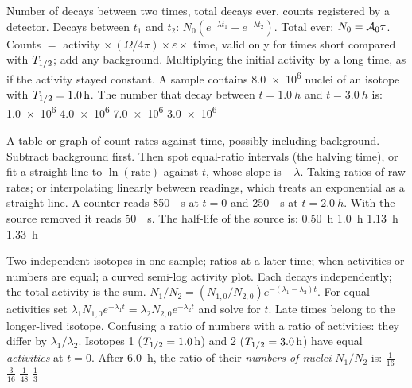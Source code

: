 {Number of decays between two times, total decays ever, counts registered by a detector.}
{Decays between $t_1$ and $t_2$: $N_0(e^{-\lambda t_1}-e^{-\lambda t_2})$. Total ever: $N_0=\mathcal{A}_0\tau$.
Counts $=$ activity $\times\,(\Omega/4\pi)\times\varepsilon\times$ time, valid only for times short
compared with $T_{1/2}$; add any background.}
{Multiplying the initial activity by a long time, as if the activity stayed constant.}
{A sample contains \num{8.0e6} nuclei of an isotope with $T_{1/2}=\SI{1.0}{h}$. The number that decay
between $t=\SI{1.0}{h}$ and $t=\SI{3.0}{h}$ is:}
{\num{1.0e6}}
{\num{4.0e6}}
{\num{7.0e6}}
{\num{3.0e6}}

{A table or graph of count rates against time, possibly including background.}
{Subtract background first. Then spot equal-ratio intervals (the halving time), or fit a straight line
to $\ln(\text{rate})$ against $t$, whose slope is $-\lambda$.}
{Taking ratios of raw rates; or interpolating linearly between readings, which treats an exponential as
a straight line.}
{A counter reads \SI{850}{\per\second} at $t=0$ and \SI{250}{\per\second} at $t=\SI{2.0}{h}$. With
the source removed it reads \SI{50}{\per\second}. The half-life of the source is:}
{\SI{0.50}{h}}
{\SI{1.0}{h}}
{\SI{1.13}{h}}
{\SI{1.33}{h}}

{Two independent isotopes in one sample; ratios at a later time; when activities or numbers are equal;
a curved semi-log activity plot.}
{Each decays independently; the total activity is the sum. $N_1/N_2=(N_{1,0}/N_{2,0})e^{-(\lambda_1-\lambda_2)t}$.
For equal activities set $\lambda_1N_{1,0}e^{-\lambda_1t}=\lambda_2N_{2,0}e^{-\lambda_2t}$ and solve
for $t$. Late times belong to the longer-lived isotope.}
{Confusing a ratio of numbers with a ratio of activities: they differ by $\lambda_1/\lambda_2$.}
{Isotopes 1 ($T_{1/2}=\SI{1.0}{h}$) and 2 ($T_{1/2}=\SI{3.0}{h}$) have equal \emph{activities} at
$t=0$. After \SI{6.0}{h}, the ratio of their \emph{numbers of nuclei} $N_1/N_2$ is:}
{$\tfrac1{16}$}
{$\tfrac3{16}$}
{$\tfrac1{48}$}
{$\tfrac13$}

